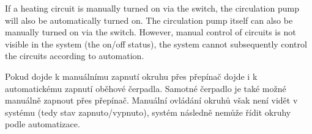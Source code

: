 \begin{English}
If a heating circuit is manually turned on via the switch, the circulation pump will also be automatically turned on. The circulation pump itself can also be manually turned on via the switch.
However, manual control of circuits is not visible in the system (the on/off status),  the system cannot subsequently control the circuits according to automation.
\end{English}

\begin{Czech}
Pokud dojde k manuálnímu zapnutí okruhu přes přepínač dojde i k automatickému zapnutí oběhové čerpadla. Samotné čerpadlo je také možné manuálně zapnout přes přepínač. Manuální ovládání okruhů však není vidět v systému (tedy stav zapnuto/vypnuto), systém následně nemůže řídit okruhy podle automatizace.  
\end{Czech}


\begin{English}
\end{English}

\begin{Czech}
\end{Czech}

